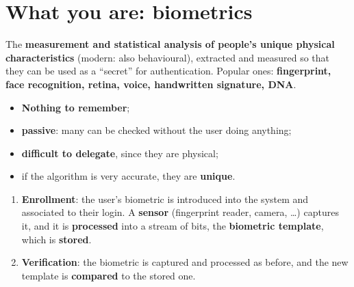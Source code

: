 \section{What you are: biometrics}

\begin{defnbox}[title=Biometrics]
The \textbf{measurement and statistical analysis of people's unique physical characteristics}
(modern: also behavioural), extracted and measured so that they can be used as a ``secret'' for
authentication. Popular ones: \textbf{fingerprint, face recognition, retina, voice, handwritten
signature, DNA}.
\end{defnbox}

\begin{propbox}[title=Advantages]
\begin{itemize}
  \item \textbf{Nothing to remember};
  \item \textbf{passive}: many can be checked without the user doing anything;
  \item \textbf{difficult to delegate}, since they are physical;
  \item if the algorithm is very accurate, they are \textbf{unique}.
\end{itemize}
\end{propbox}

\begin{defnbox}[title=Biometric authentication: enrollment and verification]
\begin{enumerate}
  \item \textbf{Enrollment}: the user's biometric is introduced into the system and associated to
        their login. A \textbf{sensor} (fingerprint reader, camera, \ldots) captures it, and it is
        \textbf{processed} into a stream of bits, the \textbf{biometric template}, which is
        \textbf{stored}.
  \item \textbf{Verification}: the biometric is captured and processed as before, and the new
        template is \textbf{compared} to the stored one.
\end{enumerate}
\end{defnbox}

